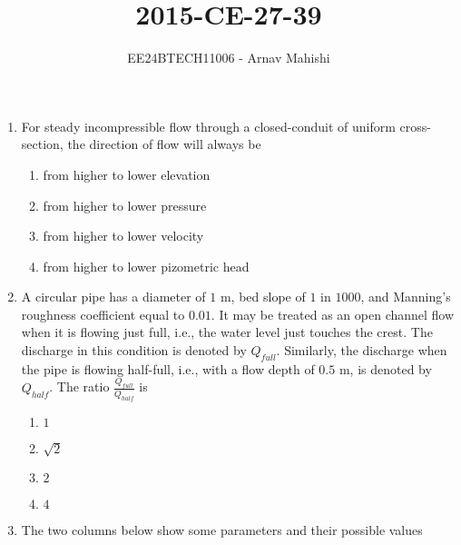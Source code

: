 \documentclass[journal]{IEEEtran}
\begin{document}

\vspace{3cm}

\title{2015-CE-27-39}
\author{EE24BTECH11006 - Arnav Mahishi}
{\let\newpage\relax\maketitle}
\begin{enumerate}
\item{
For steady incompressible flow through a closed-conduit of uniform cross-section, the direction of flow will always be
\begin{multicols}{2}
\begin{enumerate}
\item from higher to lower elevation 
\item from higher to lower pressure
\item from higher to lower velocity
\item from higher to lower pizometric head
\end{enumerate}
\end{multicols}
}
\item{
A circular pipe has a diameter of $1$ m, bed slope of $1$ in $1000$, and Manning's roughness coefficient equal to $0.01$. It may be treated as an open channel flow when it is flowing just full, i.e., the water level just touches the crest. The discharge in this condition is denoted by $Q_{full}$. Similarly, the discharge when the pipe is flowing half-full, i.e., with a flow depth of $0.5$ m, is denoted by $Q_{half}$. The ratio $\frac{Q_{full}}{Q_{half}}$ is
\begin{multicols}{2}
\begin{enumerate}
\item $1$ 
\item $\sqrt{2}$
\item $2$
\item $4$
\end{enumerate}
\end{multicols}}
\item{
The two columns below show some parameters and their possible values\\
\begin{table}[h!]    
  \centering
  
\end{table}
}
\end{enumerate}
\end{document}
